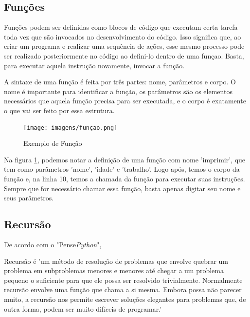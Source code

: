 \documentclass[a4paper, 12pt]{article} %
\begin{document}
\subsection{Funções}
\label{Funções}
Funções podem ser definidas como blocos de código que executam certa tarefa toda vez que são invocados no desenvolvimento do código. Isso significa que, ao criar um programa e realizar uma sequência de ações, esse mesmo processo pode ser realizado posteriormente no código ao defini-lo dentro de uma funçao. Basta, para executar aquela instrução novamente, invocar a função.

A sintaxe de uma função é feita por três partes: nome, parâmetros e corpo. O nome é importante para identificar a função, os parâmetros são os elementos necessários que aquela função precisa para ser executada, e o corpo é exatamente o que vai ser feito por essa estrutura. 
\begin{figure}[!h]
    \centering
    \texttt{[image: imagens/funçao.png]}
    \caption{Exemplo de Função}
    \label{função}
\end{figure}

\pagebreak
Na figura \ref{função}, podemos notar a definição de uma função com nome 'imprimir', que tem como parâmetros 'nome', 'idade' e 'trabalho'. Logo após, temos o corpo da função e, na linha 10, temos a chamada da função para executar suas instruções. Sempre que for necessário chamar essa função, basta apenas digitar seu nome e seus parâmetros.

\subsection{Recursão}

De acordo com o "Pense\textit{Python}",

\begin{quoting}[rightmargin=0cm,leftmargin=4cm]

\begin{singlespace}
    {\footnotesize 
    Recursão é 'um método de resolução de problemas que envolve quebrar um problema em subproblemas menores e menores até chegar a um problema pequeno o suficiente para que ele possa ser resolvido trivialmente. Normalmente recursão envolve uma função que chama a si mesma. Embora possa não parecer muito, a recursão nos permite escrever soluções elegantes para problemas que, de outra forma, podem ser muito difíceis de programar.' \cite{recursao}
    }
\end{singlespace}

\end{quoting}
\end{document}
